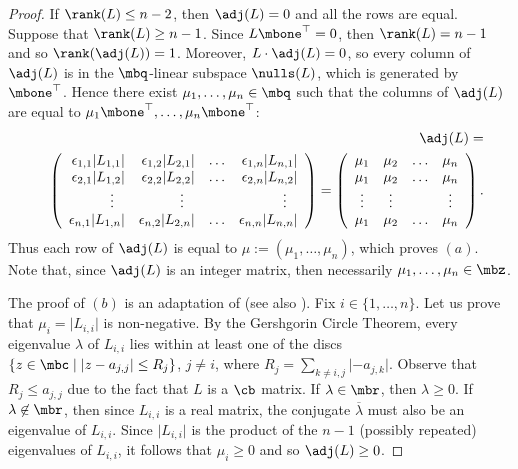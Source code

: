 \begin{proof}
If $\rank(L)\leq n-2$, then $\adj(L)=0$ and all the rows are
equal. Suppose that $\rank(L)\geq n-1$. Since $L\mbone^{\top}=0$, then
$\rank(L)=n-1$ and so $\rank(\adj(L))=1$. Moreover, $L\cdot\adj(L)=0$,
so every column of $\adj(L)$ is in the $\mbq$-linear subspace
$\nulls(L)$, which is generated by $\mbone^{\top}$. Hence there exist
$\mu_1,\ldots ,\mu_n\in\mbq$ such that the columns of $\adj(L)$ are
equal to $\mu_1\mbone^{\top}, \ldots,\mu_n\mbone^{\top}$:
\begin{eqnarray}\label{adjugate}
&&\adj(L)= \\ && \left(\begin{array}{rrrr} \epsilon_{1,1}\lvert
L_{1,1}\rvert&\epsilon_{1,2}\lvert L_{2,1}\rvert&\ldots&
\epsilon_{1,n}\lvert L_{n,1}\rvert\\ \epsilon_{2,1}\lvert
L_{1,2}\rvert&\epsilon_{2,2}\lvert L_{2,2}\rvert&\ldots&
\epsilon_{2,n}\lvert L_{n,2}\rvert\\ 
\vdots\phantom{+}&\vdots\phantom{+}&&\vdots\phantom{+}
\\ \epsilon_{n,1}\lvert L_{1,n}\rvert&\epsilon_{n,2}\lvert 
L_{2,n}\rvert&\ldots& \epsilon_{n,n}\lvert L_{n,n}\rvert
\end{array}\right)= 
\left(\begin{array}{cccc}
\mu_1&\mu_2&\ldots&\mu_n\\
\mu_1&\mu_2&\ldots&\mu_n\\
\vdots&\vdots&&\vdots\\
\mu_1&\mu_2&\ldots&\mu_n
\end{array}\right). \notag
\end{eqnarray}
Thus each row of $\adj(L)$ is equal to $\mu:=(\mu_1,\ldots ,\mu_n)$,
which proves $(a)$. Note that, since $\adj(L)$ is an integer matrix,
then necessarily $\mu_1,\ldots ,\mu_n\in\mbz$.

The proof of $(b)$ is an adaptation of \cite[Lemma~2.1]{op} (see also
\cite[Theorem~6.3,~$(c)$]{opv}). Fix $i\in\{1,\ldots ,n\}$. Let us
prove that $\mu_{i}=\lvert L_{i,i}\rvert$ is non-negative.  By the
Gershgorin Circle Theorem, every eigenvalue $\lambda$ of $L_{i,i}$
lies within at least one of the discs $\{z\in\mbc\mid \lvert
z-a_{j,j}\rvert\leq R_{j}\}$, $j\neq i$, where $R_{j}=\sum_{k\neq
  i,j}\lvert -a_{j,k}\rvert$. Observe that $R_{j}\leq a_{j,j}$ due to
the fact that $L$ is a $\cb$ matrix. If $\lambda\in\mbr$, then
$\lambda\geq 0$. If $\lambda\not\in \mbr$, then since $L_{i,i}$ is a
real matrix, the conjugate $\overline{\lambda}$ must also be an
eigenvalue of $L_{i,i}$. Since $\lvert L_{i,i}\rvert$ is the product
of the $n-1$ (possibly repeated) eigenvalues of $L_{i,i}$, it follows
that $\mu_i\geq 0$ and so $\adj(L)\geq 0$.


\end{proof}
